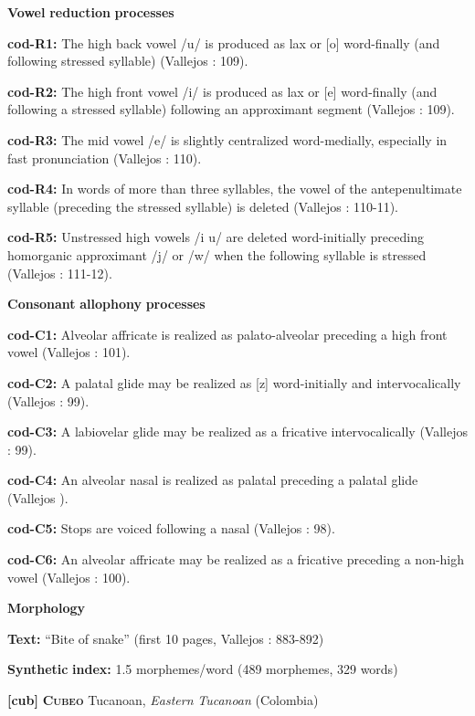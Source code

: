 \begin{styleBody}
\textbf{Vowel} \textbf{reduction} \textbf{processes}

\textbf{cod-R1:} The high back vowel /u/ is produced as lax or [o] word-finally (and following stressed syllable) (Vallejos \citealt{Yopán2010}: 109).

\textbf{cod-R2:} The high front vowel /i/ is produced as lax or [e] word-finally (and following a stressed syllable) following an approximant segment (Vallejos \citealt{Yopán2010}: 109).

\textbf{cod-R3:} The mid vowel /e/ is slightly centralized word-medially, especially in fast pronunciation (Vallejos \citealt{Yopán2010}: 110).

\textbf{cod-R4:} In words of more than three syllables, the vowel of the antepenultimate syllable (preceding the stressed syllable) is deleted (Vallejos \citealt{Yopán2010}: 110-11).

\textbf{cod-R5:} Unstressed high vowels /i u/ are deleted word-initially preceding homorganic approximant /j/ or /w/ when the following syllable is stressed (Vallejos \citealt{Yopán2010}: 111-12).

\textbf{Consonant} \textbf{allophony} \textbf{processes}

\textbf{cod-C1:} Alveolar affricate is realized as palato-alveolar preceding a high front vowel (Vallejos \citealt{Yopán2010}: 101).

\textbf{cod-C2:} A palatal glide may be realized as [z] word-initially and intervocalically (Vallejos \citealt{Yopán2010}: 99).

\textbf{cod-C3:} A labiovelar glide may be realized as a fricative intervocalically (Vallejos \citealt{Yopán2010}: 99).

\textbf{cod-C4:} An alveolar nasal is realized as palatal preceding a palatal glide (Vallejos \citealt{Yopán2010}).

\textbf{cod-C5:} Stops are voiced following a nasal (Vallejos \citealt{Yopán2010}: 98).

\textbf{cod-C6:} An alveolar affricate may be realized as a fricative preceding a non-high vowel (Vallejos \citealt{Yopán2010}: 100).

\textbf{Morphology}

\textbf{Text:} “Bite of snake” (first 10 pages, Vallejos \citealt{Yopán2010}: 883-892)

\textbf{Synthetic} \textbf{index:} 1.5 morphemes/word (489 morphemes, 329 words)

\textbf{[cub]}   \textbf{\textsc{Cubeo}}    Tucanoan, \textit{Eastern} \textit{Tucanoan} (Colombia)


\end{styleBody}
